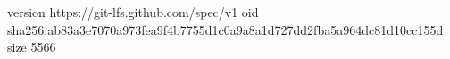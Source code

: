 version https://git-lfs.github.com/spec/v1
oid sha256:ab83a3e7070a973fea9f4b7755d1c0a9a8a1d727dd2fba5a964dc81d10cc155d
size 5566
